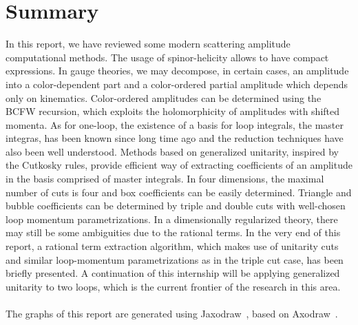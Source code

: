 \section{Summary}
In this report, we have reviewed some modern scattering amplitude computational methods. 
The usage of spinor-helicity allows to have compact expressions.
In gauge theories, we may decompose, in certain cases, an amplitude into a color-dependent part and a color-ordered partial amplitude which depends only on kinematics.
Color-ordered amplitudes can be determined using the BCFW recursion, which exploits the holomorphicity of amplitudes with shifted momenta. 
As for one-loop, the existence of a basis for loop integrals, the master integras, has been known since long time ago and the reduction techniques have also been well understood. 
Methods based on generalized unitarity, inspired by the Cutkosky rules, provide efficient way of extracting coefficients of an amplitude in the basis comprised of master integrals. 
In four dimensions, the maximal number of cuts is four and box coefficients can be easily determined. 
Triangle and bubble coefficients can be determined by triple and double cuts with well-chosen loop momentum parametrizations.
In a dimensionally regularized theory, there may still be some ambiguities due to the rational terms. 
In the very end of this report, a rational term extraction algorithm, which makes use of unitarity cuts and similar loop-momentum parametrizations as in the triple cut case, has been briefly presented. 
A continuation of this internship will be applying generalized unitarity to two loops, which is the current frontier of the research in this area.   
\\\\
The graphs of this report are generated using Jaxodraw~\cite{Binosi:2003yf}, based on Axodraw~\cite{1994CoPhC..83...45V}.

